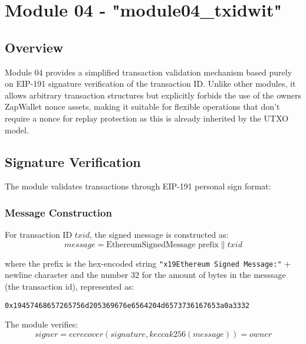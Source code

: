 \newpage
\section{Module 04 - {\ttfamily "module04\_txidwit"}}
\label{sec:module04_predicate}

\subsection{Overview}
Module 04 provides a simplified transaction validation mechanism based purely on EIP-191 signature verification of the transaction ID.
Unlike other modules, it allows arbitrary transaction structures but explicitly forbids the use of the owners ZapWallet nonce assets, making it suitable
for flexible operations that don't require a nonce for replay protection as this is already inherited by the UTXO model.\\

\subsection{Signature Verification}
The module validates transactions through EIP-191 personal sign format:\\

\subsubsection{Message Construction}
For transaction ID $txid$, the signed message is constructed as:
\[ message = \text{EthereumSignedMessage prefix} \parallel txid \]

where the prefix is the hex-encoded string \texttt{"x19Ethereum Signed Message:"} + newline character and the number 32 for the amount
of bytes in the messsage (the transaction id), represented as:
\begin{verbatim}
0x19457468657265756d205369676e6564204d6573736167653a0a3332
\end{verbatim}

The module verifies:
\[ signer = ecrecover(signature, keccak256(message)) = owner \]


